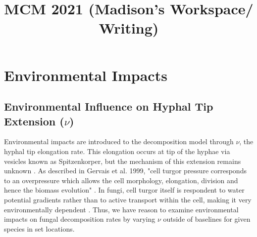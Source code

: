 \documentclass{article}
\title{MCM 2021 (Madison's Workspace/ Writing)}
\author{}
\date{}
\begin{document}



\maketitle

\section{Environmental Impacts}

\subsection{Environmental Influence on Hyphal Tip Extension ($\nu$)}
Environmental impacts are introduced to the decomposition model through $\nu$, the hyphal tip elongation rate. This elongation occurs at tip of the hyphae via vesicles known as Spitzenkorper, but the mechanism of this extension remains unknown \cite{Steinberg2007}. As described in Gervais et al. 1999, "cell turgor pressure corresponds to an overpressure which allows the cell morphology, elongation, division and hence the biomass evolution" \cite{Gervais1999}. In fungi, cell turgor itself is respondent to water potential gradients rather than to active transport within the cell, making it very environmentally dependent \cite{Gervais1999}. Thus, we have reason to examine environmental impacts on fungal decomposition rates by varying $\nu$ outside of baselines for given species in set locations.
\end{document}
